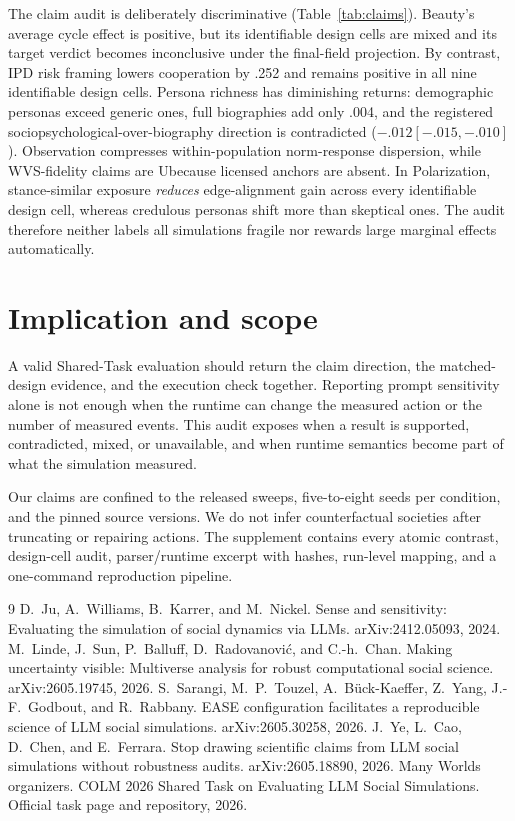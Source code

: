 \documentclass[9pt,twocolumn]{extarticle}
\newcommand{\Upt}{\textsc{U}}
\begin{document}
The claim audit is deliberately discriminative (Table~\ref{tab:claims}). Beauty's average cycle effect is positive, but its identifiable design cells are mixed and its target verdict becomes inconclusive under the final-field projection. By contrast, IPD risk framing lowers cooperation by .252 and remains positive in all nine identifiable design cells. Persona richness has diminishing returns: demographic personas exceed generic ones, full biographies add only .004, and the registered sociopsychological-over-biography direction is contradicted ($-.012[-.015,-.010]$). Observation compresses within-population norm-response dispersion, while WVS-fidelity claims are \Upt because licensed anchors are absent. In Polarization, stance-similar exposure \emph{reduces} edge-alignment gain across every identifiable design cell, whereas credulous personas shift more than skeptical ones. The audit therefore neither labels all simulations fragile nor rewards large marginal effects automatically.

\section{Implication and scope}
A valid Shared-Task evaluation should return the claim direction, the matched-design evidence, and the execution check together. Reporting prompt sensitivity alone is not enough when the runtime can change the measured action or the number of measured events. This audit exposes when a result is supported, contradicted, mixed, or unavailable, and when runtime semantics become part of what the simulation measured.

Our claims are confined to the released sweeps, five-to-eight seeds per condition, and the pinned source versions. We do not infer counterfactual societies after truncating or repairing actions. The supplement contains every atomic contrast, design-cell audit, parser/runtime excerpt with hashes, run-level mapping, and a one-command reproduction pipeline.

\vspace{-0.45em}
\begin{thebibliography}{9}
\scriptsize
\setlength{\itemsep}{-0.2em}
 D.~Ju, A.~Williams, B.~Karrer, and M.~Nickel. Sense and sensitivity: Evaluating the simulation of social dynamics via LLMs. arXiv:2412.05093, 2024.
 M.~Linde, J.~Sun, P.~Balluff, D.~Radovanovi\'c, and C.-h.~Chan. Making uncertainty visible: Multiverse analysis for robust computational social science. arXiv:2605.19745, 2026.
 S.~Sarangi, M.~P.~Touzel, A.~B\"uck-Kaeffer, Z.~Yang, J.-F.~Godbout, and R.~Rabbany. EASE configuration facilitates a reproducible science of LLM social simulations. arXiv:2605.30258, 2026.
 J.~Ye, L.~Cao, D.~Chen, and E.~Ferrara. Stop drawing scientific claims from LLM social simulations without robustness audits. arXiv:2605.18890, 2026.
 Many Worlds organizers. COLM 2026 Shared Task on Evaluating LLM Social Simulations. Official task page and repository, 2026.
\end{thebibliography}
\end{document}
